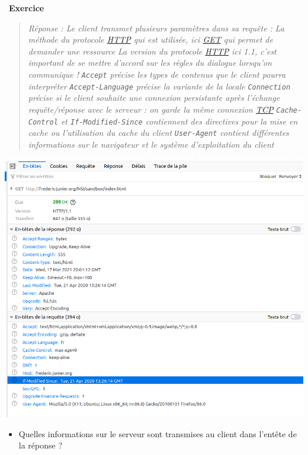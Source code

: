 \documentclass[
  11pt,
]{article}
\newcommand{\passthrough}[1]{#1}
\providecommand{\tightlist}{%
  \setlength{\itemsep}{0pt}\setlength{\parskip}{0pt}}
\newcounter{exo}
\newenvironment{exercice}[1]
{\par \medskip   \addtocounter{exo}{1} \noindent  
\begin{bclogo}[arrondi =0.1,   noborder = true, logo=\bccrayon, marge=4]{~\textbf{Exercice} \textbf{\theexo} {\itshape #1} }  \par}
{
\end{bclogo}
 \par \bigskip }
\begin{document}
\begin{exercice}{}
\begin{enumerate}
\begin{itemize}
    \begin{quote}
    \emph{Réponse : Le client transmet plusieurs paramètres dans sa
    requête :} \emph{La méthode du protocole \url{HTTP} qui est
    utilisée, ici \url{GET} qui permet de demander une ressource}
    \emph{La version du protocole \url{HTTP} ici 1.1, c'est important de
    se mettre d'accord sur les règles du dialogue lorsqu'on communique
    !} \emph{\passthrough{\lstinline!Accept!} précise les types de
    contenus que le client pourra interpréter}
    \emph{\passthrough{\lstinline!Accept-Language!} précise la variante
    de la locale} \emph{\passthrough{\lstinline!Connection!} précise si
    le client souhaite une connexion persistante après l'échange
    requête/réponse avec le serveur : on garde la même connexion
    \url{TCP}} \emph{\passthrough{\lstinline!Cache-Control!} et
    \passthrough{\lstinline!If-Modified-Since!} contiennent des
    directives pour la mise en cache ou l'utilisation du cache du
    client} \emph{\passthrough{\lstinline!User-Agent!} contient
    différentes informations sur le navigateur et le système
    d'exploitation du client}
    \end{quote}
  \end{itemize}

  \includegraphics[width=1\textwidth,height=\textheight]{images/en_tete_http.png}\\

  \begin{itemize}
  \tightlist
  \item
    Quelles informations sur le serveur sont transmises au client dans
    l'entête de la réponse ?
  \end{itemize}


\end{enumerate}
\end{exercice}
\end{document}
